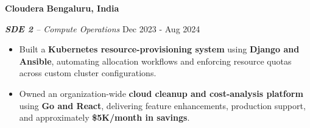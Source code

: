 \textbf{Cloudera} \hfill
{\faMapMarker} \textbf{{Bengaluru, India}}



\textit{\textbf{SDE 2} – Compute Operations}
\hfill {\faCalendar} Dec 2023 - Aug 2024 \par
\begin{itemize}
\item Built a \textbf{Kubernetes resource-provisioning system} using \textbf{Django and Ansible}, automating allocation workflows and enforcing resource quotas across custom cluster configurations.
\item Owned an organization-wide \textbf{cloud cleanup and cost-analysis platform} using \textbf{Go and React}, delivering feature enhancements, production support, and approximately \textbf{\$5K/month in savings}.
\end{itemize}

